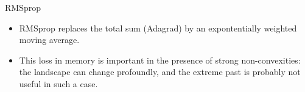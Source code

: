 \documentclass[handout,xcolor=pdftex,dvipsnames,table,mathserif]{beamer}
\begin{document}
\begin{frame}{RMSprop}
\begin{itemize}
\item RMSprop replaces the total sum (Adagrad) by an expontentially weighted moving average. 
\item This loss in memory is important in the presence of strong non-convexities: the landscape can change profoundly, and the extreme past is probably not useful in such a case. 
\end{itemize}
\end{frame}
	
\end{document}
